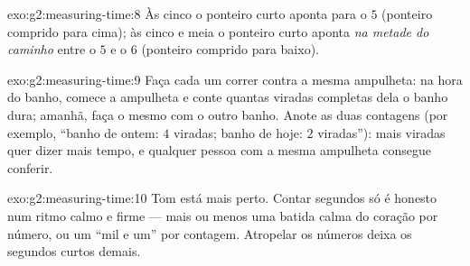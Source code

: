 \begin{solution}{exo:g2:measuring-time:8}
Às cinco  o ponteiro curto aponta para o $5$ (ponteiro comprido
para cima); às cinco e meia o ponteiro curto aponta \emph{na metade
do caminho} entre o $5$ e o $6$ (ponteiro comprido para baixo).
\end{solution}

\begin{solution}{exo:g2:measuring-time:9}
Faça cada um correr contra a mesma ampulheta: na hora do banho,
comece a ampulheta e conte quantas viradas completas dela o banho
dura; amanhã, faça o mesmo com o outro banho. Anote as duas contagens
(por exemplo, ``banho de ontem: $4$ viradas; banho de hoje: $2$
viradas''): mais viradas quer dizer mais tempo, e qualquer pessoa com
a mesma ampulheta consegue conferir.
\end{solution}

\begin{solution}{exo:g2:measuring-time:10}
Tom está mais perto. Contar segundos só é honesto num ritmo calmo e
firme --- mais ou menos uma batida calma do coração por número, ou um
``mil e um'' por contagem. Atropelar os números deixa os segundos
curtos demais.
\end{solution}
